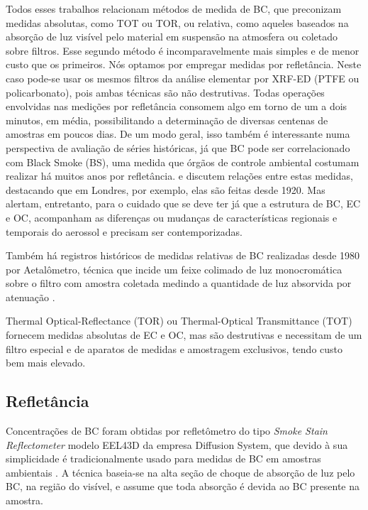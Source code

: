 Todos esses trabalhos relacionam métodos de medida de BC, que preconizam medidas
absolutas, como TOT ou TOR,  ou relativa, como aqueles baseados na absorção de 
luz visível pelo material em suspensão na atmosfera ou coletado sobre filtros. 
Esse segundo método é incomparavelmente mais simples e de menor custo que os 
primeiros. Nós optamos por empregar medidas por refletância. Neste caso pode-se 
usar os mesmos filtros da análise elementar por XRF-ED (PTFE ou policarbonato), 
pois ambas técnicas são não destrutivas. Todas operações envolvidas nas medições
por refletância consomem algo em torno de um a dois minutos, em média, 
possibilitando a determinação de diversas centenas de amostras em poucos dias.
De um modo geral, isso também é interessante numa perspectiva de avaliação de 
séries históricas, já que BC pode ser correlacionado com Black Smoke (BS), 
uma medida que órgãos de controle ambiental costumam realizar há muitos anos 
por refletância. \citet{quincey2007} e \citet{heal2012} discutem relações entre 
estas medidas, destacando que em Londres, por exemplo, elas são feitas desde 
1920. Mas alertam, entretanto, para o cuidado que se deve ter já que a estrutura 
de BC, EC e OC, acompanham as diferenças ou mudanças de características regionais 
e temporais do aerossol e precisam ser contemporizadas.

Também há registros históricos de medidas relativas de BC realizadas desde 
1980 por Aetalômetro, técnica que incide um feixe colimado de luz monocromática 
sobre o filtro com amostra coletada medindo a quantidade de luz absorvida
por atenuação \citep{targino2016}. 

Thermal Optical-Reflectance (TOR) ou Thermal-Optical Transmittance (TOT) 
fornecem medidas absolutas de EC e OC, mas são destrutivas e necessitam de um 
filtro especial e de aparatos de medidas e amostragem exclusivos, 
tendo custo bem mais elevado.

\subsection{Refletância}

Concentrações de BC foram obtidas por refletômetro do tipo 
\textit{Smoke Stain Reflectometer} modelo EEL43D da empresa Diffusion System, 
que devido à sua simplicidade é tradicionalmente usado para medidas de BC em 
amostras ambientais \citep{lack2014}. A técnica baseia-se na alta seção 
de choque de absorção de luz pelo BC, na região do visível, e assume que 
toda absorção é devida ao BC presente na amostra.

